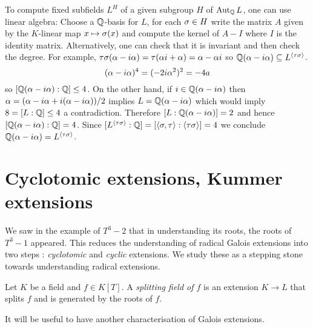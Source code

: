 \documentclass{article}
\begin{document}
\begin{eg}
\begin{cd}
    \arrow[from=2-3, to=1-3]
    \arrow[from=2-4, to=1-3]
    \arrow[from=2-5, to=1-3]
    \arrow[from=3-2, to=2-1]
    \arrow[from=3-2, to=2-2]
    \arrow[from=3-2, to=2-3]
    \arrow[from=3-3, to=2-3]
    \arrow[from=3-4, to=2-3]
    \arrow[from=3-4, to=2-4]
    \arrow[from=3-4, to=2-5]
    \arrow[from=4-3, to=3-2]
    \arrow[from=4-3, to=3-3]
    \arrow[from=4-3, to=3-4]
  \end{cd}
  To compute fixed subfields $L^H$ of a given subgroup $H$ of $\operatorname{Aut}_{\mathbb{Q}} L$,
  one can use linear algebra:
  Choose a $\mathbb{Q}$-basis for $L$,
  for each $\sigma \in H$
  write the matrix $A$ given by the $K$-linear map $x \mapsto \sigma(x)$
  and compute the kernel of $A - I$ where $I$ is the identity matrix.
  Alternatively, one can check that it is invariant and then check the degree.
  For example, $\tau\sigma(\alpha - i \alpha) = \tau(\alpha i + \alpha) = \alpha - \alpha i$
  so $\mathbb{Q}(\alpha - i \alpha) \subseteq L^{\langle \tau \sigma \rangle}$.
  \[
    (\alpha - i \alpha)^4 = (- 2 i \alpha^2)^2 = - 4 a
  \]
  so $[\mathbb{Q}(\alpha - i \alpha) : \mathbb{Q}] \leq 4$.
  On the other hand, if $i \in \mathbb{Q}(\alpha - i \alpha)$ then
  $\alpha = (\alpha - i \alpha + i (\alpha - i \alpha)) / 2$ implies
  $L = \mathbb{Q}(\alpha - i \alpha)$ which would imply $8 = [L : \mathbb{Q}] \leq 4$
  a contradiction.
  Therefore $[L : \mathbb{Q}(\alpha - i \alpha)] = 2$ and hence
  $[\mathbb{Q}(\alpha - i \alpha) : \mathbb{Q}] = 4$.
  Since $[L^{\langle \tau \sigma \rangle} : \mathbb{Q}] = [\langle \sigma , \tau \rangle : \langle \tau \sigma\rangle] = 4$
  we conclude $\mathbb{Q}(\alpha - i \alpha) = L^{\langle \tau \sigma \rangle}$.
\end{eg}

\section{Cyclotomic extensions, Kummer extensions}

We saw in the example of $T^3 - 2$ that
in understanding its roots, the roots of $T^3 - 1$ appeared.
This reduces the understanding of radical Galois extensions
into two steps : \emph{cyclotomic} and \emph{cyclic} extensions.
We study these as a stepping stone towards understanding 
radical extensions.

\begin{dfn}
  
  Let $K$ be a field and $f \in K[T]$.
  A \emph{splitting field of $f$} is an extension
  $K \to L$ that splits $f$ and is generated by the roots of $f$.
\end{dfn}
It will be useful to have another characterisation of Galois extensions.
\end{document}
